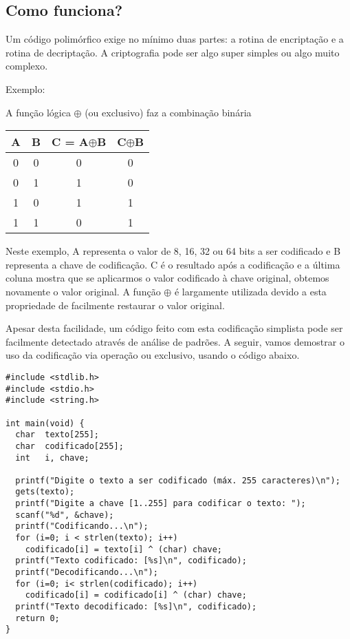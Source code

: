\subsection{Como funciona?}

Um código polimórfico exige no mínimo duas partes: a rotina de encriptação e a rotina de decriptação. A criptografia pode ser algo super simples ou algo muito complexo.

Exemplo: 

A função lógica $ \oplus $ (ou exclusivo) faz a combinação binária

\begin{tabular}{|c|c|c|c|}
\hline 
A&B&C = A$ \oplus $B&C$ \oplus $B\\
\hline
0&0&0&0\\
0&1&1&0\\
1&0&1&1\\
1&1&0&1\\
\hline
\end{tabular}

Neste exemplo, A representa o valor de 8, 16, 32 ou 64 bits a ser codificado e B representa a chave de codificação. C é o resultado após a codificação e a última coluna mostra que se aplicarmos o valor codificado à chave original, obtemos novamente o valor original. A função $ \oplus $ é largamente utilizada devido a esta propriedade de facilmente restaurar o valor original.

Apesar desta facilidade, um código feito com esta codificação simplista pode ser facilmente detectado através de análise de padrões. A seguir, vamos demostrar o uso da codificação via operação ou exclusivo, usando o código abaixo.

{{{
\renewcommand{\baselinestretch}{1.0}
\begin{verbatim}
#include <stdlib.h>
#include <stdio.h>
#include <string.h>

int main(void) {
  char  texto[255];
  char  codificado[255];
  int   i, chave;

  printf("Digite o texto a ser codificado (máx. 255 caracteres)\n");
  gets(texto);
  printf("Digite a chave [1..255] para codificar o texto: ");
  scanf("%d", &chave);
  printf("Codificando...\n");
  for (i=0; i < strlen(texto); i++) 
    codificado[i] = texto[i] ^ (char) chave;
  printf("Texto codificado: [%s]\n", codificado);
  printf("Decodificando...\n");
  for (i=0; i< strlen(codificado); i++) 
    codificado[i] = codificado[i] ^ (char) chave;
  printf("Texto decodificado: [%s]\n", codificado);
  return 0;
}
\end{verbatim}
}}}

